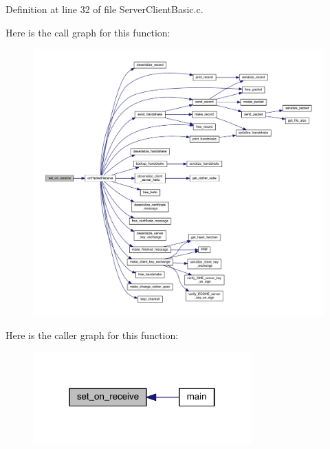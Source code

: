 Definition at line 32 of file Server\+Client\+Basic.\+c.



Here is the call graph for this function\+:\nopagebreak
\begin{figure}[H]
\begin{center}
\leavevmode
\includegraphics[width=350pt]{_server_client_basic_8h_a5b4ec3e9c08effaa58ed3dd61374eec3_cgraph}
\end{center}
\end{figure}




Here is the caller graph for this function\+:\nopagebreak
\begin{figure}[H]
\begin{center}
\leavevmode
\includegraphics[width=238pt]{_server_client_basic_8h_a5b4ec3e9c08effaa58ed3dd61374eec3_icgraph}
\end{center}
\end{figure}


